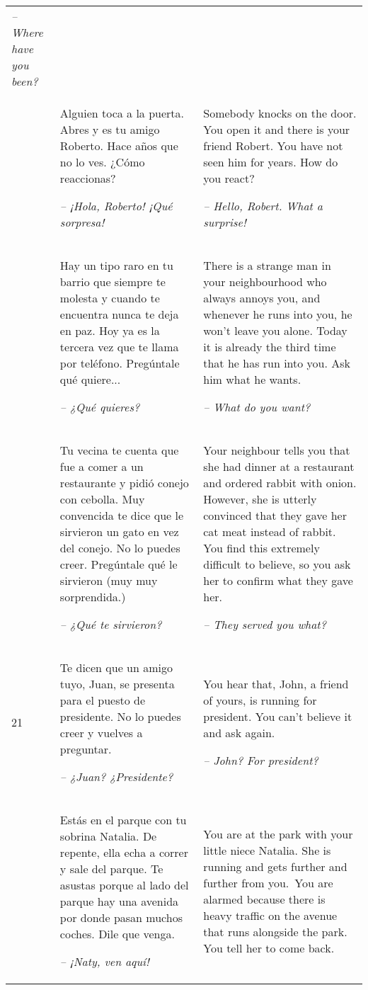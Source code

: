 \begin{xltabular}{\textwidth}{lQQ}
{\itshape -- Where have you been?}\\
 & Alguien toca a la puerta. Abres y es tu amigo Roberto. Hace años que no lo ves. ¿Cómo reaccionas?

\textit{-- ¡Hola, Roberto! ¡Qué sorpresa!} & Somebody knocks on the door. You open it and there is your friend Robert. You have not seen him for years. How do you react?

{\itshape -- Hello, Robert. What a surprise!}\\
 & Hay un tipo raro en tu barrio que siempre te molesta y cuando te encuentra nunca te deja en paz. Hoy ya es la tercera vez que te llama por teléfono. Pregúntale qué quiere...

\textit{-- ¿Qué quieres?} & There is a strange man in your neighbourhood who always annoys you, and whenever he runs into you, he won’t leave you alone. Today it is already the third time that he has run into you. Ask him what he wants.

{\itshape -- What do you want?}\\
 & Tu vecina te cuenta que fue a comer a un restaurante y pidió conejo con cebolla. Muy convencida te dice que le sirvieron un gato en vez del conejo. No lo puedes creer. Pregúntale qué le sirvieron (muy muy sorprendida.)

\textit{-- ¿Qué te sirvieron?} & Your neighbour tells you that she had dinner at a restaurant and ordered rabbit with onion. However, she is utterly convinced that they gave her cat meat instead of rabbit. You find this extremely difficult to believe, so you ask her to confirm what they gave her.

{\itshape -- They served you what?}\\
21 & Te dicen que un amigo tuyo, Juan, se presenta para el puesto de presidente. No lo puedes creer y vuelves a preguntar.

\textit{-- ¿Juan? ¿Presidente?} & You hear that, John, a friend of yours, is running for president. You can’t believe it and ask again.

{\itshape -- John? For president?}\\
 & Estás en el parque con tu sobrina Natalia. De repente, ella echa a correr y sale del parque. Te asustas porque al lado del parque hay una avenida por donde pasan muchos coches. Dile que venga.

\textit{-- ¡Naty, ven aquí!} & You are at the park with your little niece Natalia. She is running and gets further and further from you.~You are alarmed because there is heavy traffic on the avenue that runs alongside the park. You tell her to come back.


\end{xltabular}
